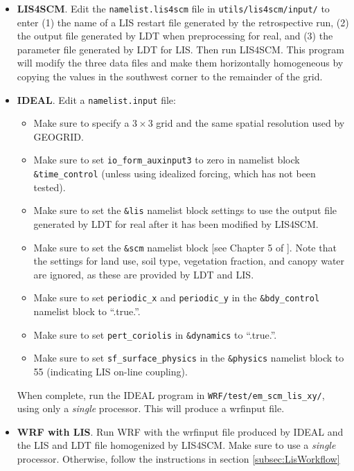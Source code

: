 \begin{itemize}
\item \textbf{LIS4SCM}.  Edit the \texttt{namelist.lis4scm} file in 
\texttt{utils/lis4scm/input/} to enter (1) the name of a LIS restart file 
generated by the retrospective run, (2) the output file generated by LDT when 
preprocessing for real, and (3) the parameter file generated by LDT for LIS.  
Then run LIS4SCM.  This program will modify the three data files and make them
horizontally homogeneous by copying the values in the southwest corner to the 
remainder of the grid.

\item \textbf{IDEAL}.  Edit a \texttt{namelist.input} file:  
  \begin{itemize}

    \item Make sure to specify a $3 \times 3$ grid and the same spatial 
      resolution used by GEOGRID.
    \item Make sure to set \texttt{io\_form\_auxinput3} to zero in namelist 
      block \texttt{\&time\_control} (unless using idealized forcing, which 
      has not been tested).  
    \item Make sure to set the \texttt{\&lis} namelist block settings to use 
      the output file generated by LDT for real after it has been modified by
      LIS4SCM.
    \item Make sure to set the \texttt{\&scm} namelist block [see Chapter 5 of
      \cite{ref:ArwUserGuide}].  Note that the settings for land use,
      soil type, vegetation fraction, and canopy water are ignored, as these 
      are provided by LDT and LIS.
    \item Make sure to set \texttt{periodic\_x} and \texttt{periodic\_y}
      in the \texttt{\&bdy\_control} namelist block to ``.true.''.
    \item Make sure to set \texttt{pert\_coriolis} in \texttt{\&dynamics} to
      ``.true.''.
    \item Make sure to set \texttt{sf\_surface\_physics} in the 
      \texttt{\&physics} namelist block to 55 (indicating LIS on-line 
      coupling).
  \end{itemize}

  When complete, run the IDEAL program in \texttt{WRF/test/em\_scm\_lis\_xy/},
  using only a \emph{single} processor.  This will produce a wrfinput file.

  \item \textbf{WRF with LIS}.  Run WRF with the wrfinput file produced by
    IDEAL and the LIS and LDT file homogenized by LIS4SCM.  Make sure to use
    a \emph{single} processor.  Otherwise, follow the instructions in section
    \ref{subsec:LisWorkflow}

\end{itemize}

